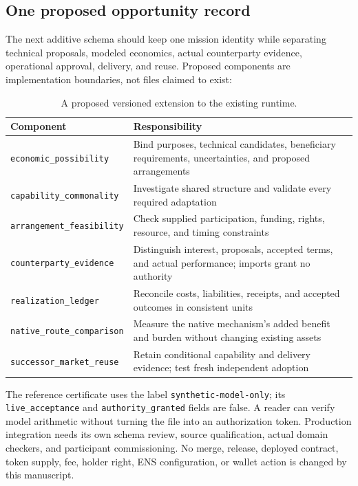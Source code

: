 \documentclass[11pt,letterpaper]{article}
\theoremstyle{remark}\newtheorem{remark}{Remark}[section]
\begin{document}
\subsection{One proposed opportunity record}
The next additive schema should keep one mission identity while separating technical proposals, modeled economics, actual counterparty evidence, operational approval, delivery, and reuse. Proposed components are implementation boundaries, not files claimed to exist:
\begin{table}[htbp]\centering\small
\caption{A proposed versioned extension to the existing runtime.}\label{tab:modules}
\begin{tabularx}{\linewidth}{@{}P{.34\linewidth}Y@{}}\toprule
Component & Responsibility\\\midrule
\texttt{economic\_possibility} & Bind purposes, technical candidates, beneficiary requirements, uncertainties, and proposed arrangements\\
\texttt{capability\_commonality} & Investigate shared structure and validate every required adaptation\\
\texttt{arrangement\_feasibility} & Check supplied participation, funding, rights, resource, and timing constraints\\
\texttt{counterparty\_evidence} & Distinguish interest, proposals, accepted terms, and actual performance; imports grant no authority\\
\texttt{realization\_ledger} & Reconcile costs, liabilities, receipts, and accepted outcomes in consistent units\\
\texttt{native\_route\_comparison} & Measure the native mechanism's added benefit and burden without changing existing assets\\
\texttt{successor\_market\_reuse} & Retain conditional capability and delivery evidence; test fresh independent adoption\\\bottomrule
\end{tabularx}
\end{table}

The reference certificate uses the label \texttt{synthetic-model-only}; its \texttt{live\_acceptance} and \texttt{authority\_granted} fields are false. A reader can verify model arithmetic without turning the file into an authorization token. Production integration needs its own schema review, source qualification, actual domain checkers, and participant commissioning. No merge, release, deployed contract, token supply, fee, holder right, ENS configuration, or wallet action is changed by this manuscript.
\end{document}
